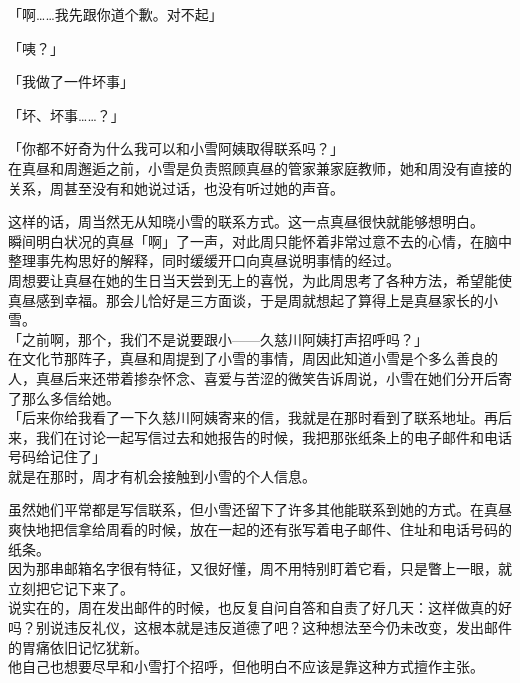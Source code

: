 「啊……我先跟你道个歉。对不起」

「咦？」

「我做了一件坏事」

「坏、坏事……？」

「你都不好奇为什么我可以和小雪阿姨取得联系吗？」\\

在真昼和周邂逅之前，小雪是负责照顾真昼的管家兼家庭教师，她和周没有直接的关系，周甚至没有和她说过话，也没有听过她的声音。

这样的话，周当然无从知晓小雪的联系方式。这一点真昼很快就能够想明白。\\

瞬间明白状况的真昼「啊」了一声，对此周只能怀着非常过意不去的心情，在脑中整理事先构思好的解释，同时缓缓开口向真昼说明事情的经过。\\

周想要让真昼在她的生日当天尝到无上的喜悦，为此周思考了各种方法，希望能使真昼感到幸福。那会儿恰好是三方面谈，于是周就想起了算得上是真昼家长的小雪。\\

「之前啊，那个，我们不是说要跟小——久慈川阿姨打声招呼吗？」\\

在文化节那阵子，真昼和周提到了小雪的事情，周因此知道小雪是个多么善良的人，真昼后来还带着掺杂怀念、喜爱与苦涩的微笑告诉周说，小雪在她们分开后寄了那么多信给她。\\

「后来你给我看了一下久慈川阿姨寄来的信，我就是在那时看到了联系地址。再后来，我们在讨论一起写信过去和她报告的时候，我把那张纸条上的电子邮件和电话号码给记住了」\\

就是在那时，周才有机会接触到小雪的个人信息。

虽然她们平常都是写信联系，但小雪还留下了许多其他能联系到她的方式。在真昼爽快地把信拿给周看的时候，放在一起的还有张写着电子邮件、住址和电话号码的纸条。\\

因为那串邮箱名字很有特征，又很好懂，周不用特别盯着它看，只是瞥上一眼，就立刻把它记下来了。\\

说实在的，周在发出邮件的时候，也反复自问自答和自责了好几天：这样做真的好吗？别说违反礼仪，这根本就是违反道德了吧？这种想法至今仍未改变，发出邮件的胃痛依旧记忆犹新。\\

他自己也想要尽早和小雪打个招呼，但他明白不应该是靠这种方式擅作主张。

